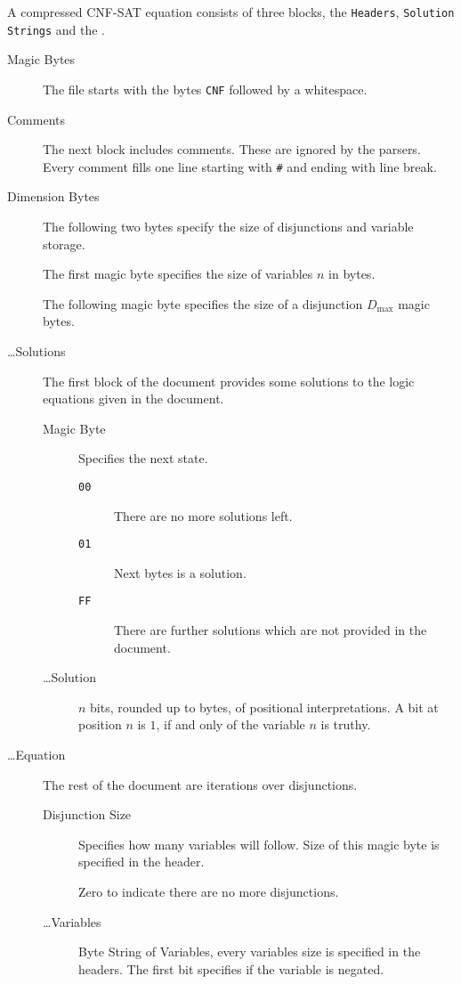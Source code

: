 \documentclass[12pt, letterpaper]{article}
\begin{document}
	A compressed CNF-SAT equation consists of three blocks,
	the \texttt{Headers}, \texttt{Solution Strings} and the
	.

    \begin{description}
		\item[Magic Bytes] {
        	The file starts with the bytes \texttt{CNF}
			followed by a whitespace.
        }
		\item[Comments] {
        	The next block includes comments. These are
			ignored by the parsers. Every comment fills
			one line starting with \texttt{\#} and ending
			with line break.
        }
		\item[Dimension Bytes] {
			The following two bytes specify the size of
			disjunctions and variable storage.

        	The first magic byte specifies the size of
			variables $n$ in bytes.

			The following magic byte specifies the size
			of a disjunction $D_\text{max}$ magic bytes.
        }

		\item[\ldots Solutions] {
			The first block of the document provides some
			solutions to the logic equations given in the 
			document.

			\begin{description}
				\item[Magic Byte] {
					Specifies the next state.

					\begin{description}
						\item[\texttt{00}] {
							There are no more solutions
							left.
						} 
						\item[\texttt{01}] {
							Next bytes is a solution.
						} 
						\item[\texttt{FF}] {
							There are further solutions
							which are not provided in the 
							document.
						} 
					\end{description}
				} 
				\item[\ldots Solution] {
					$n$ bits, rounded up to bytes, of
					positional interpretations. A bit
					at position $n$ is $1$, if and
					only of the variable $n$ is truthy.
				} 
			\end{description}
        }

		\item[\ldots Equation] {
			The rest of the document are iterations over
			disjunctions.

			\begin{description}
				\item[Disjunction Size] {
					Specifies how many variables will
					follow. Size of this magic byte is
					specified in the header.

					Zero to indicate there are no more
					disjunctions.
				} 
				\item[\ldots Variables] {
					Byte String of Variables, every
					variables size is specified in the
					headers. The first bit specifies if
					the variable is negated.
				} 
			\end{description}
        }
    \end{description}

	
\end{document}
